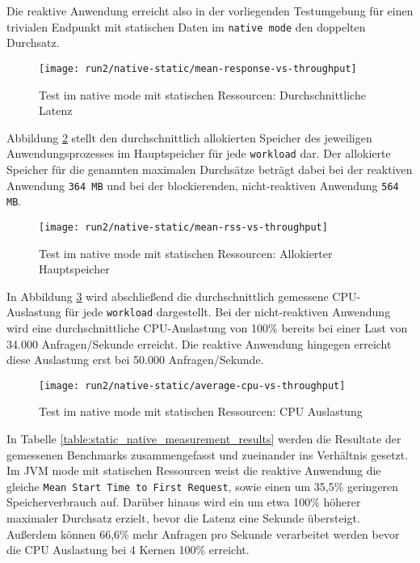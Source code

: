 Die reaktive Anwendung erreicht also in der vorliegenden Testumgebung für einen trivialen
Endpunkt mit statischen Daten im \verb|native mode| den doppelten Durchsatz.
\newpage
\begin{figure}[ht!]
  \centering
  \texttt{[image: run2/native-static/mean-response-vs-throughput]}
  \caption{Test im native mode mit statischen Ressourcen: Durchschnittliche Latenz}
  \label{fig:native_static_mean_response}
\end{figure}
Abbildung \ref{fig:native_static_mean_rss} stellt den durchschnittlich allokierten Speicher des jeweiligen Anwendungsprozesses
im Hauptspeicher für jede \verb|workload| dar. Der allokierte Speicher für die genannten maximalen Durchsätze beträgt dabei bei
der reaktiven Anwendung \verb|364 MB| und bei der blockierenden, nicht-reaktiven Anwendung \verb|564 MB|.
\newpage
\begin{figure}[ht!]
  \centering
  \texttt{[image: run2/native-static/mean-rss-vs-throughput]}
  \caption{Test im native mode mit statischen Ressourcen: Allokierter Hauptspeicher}
  \label{fig:native_static_mean_rss}
\end{figure}

In Abbildung \ref{fig:native_static_avg_cpu} wird abschließend die durchschnittlich gemessene CPU-Auslastung für jede \verb|workload|
dargestellt. Bei der nicht-reaktiven Anwendung wird eine durchschnittliche CPU-Auslastung von 100\% bereits bei einer Last von
34.000 Anfragen/Sekunde erreicht. Die reaktive Anwendung hingegen erreicht diese Auslastung erst bei 50.000 Anfragen/Sekunde.
\newpage
\begin{figure}[ht!]
  \centering
  \texttt{[image: run2/native-static/average-cpu-vs-throughput]}
  \caption{Test im native mode mit statischen Ressourcen: CPU Auslastung}
  \label{fig:native_static_avg_cpu}
\end{figure}

In Tabelle \ref{table:static_native_measurement_results} werden die Resultate der gemessenen Benchmarks zusammengefasst
und zueinander ins Verhältnis gesetzt. Im JVM mode mit statischen Ressourcen weist die reaktive Anwendung
die gleiche \verb|Mean Start Time to First Request|, sowie
einen um 35,5\% geringeren Speicherverbrauch auf.
Darüber hinaus wird ein um etwa 100\% höherer maximaler Durchsatz erzielt, bevor die Latenz eine Sekunde übersteigt.
Außerdem können 66,6\% mehr Anfragen pro Sekunde verarbeitet werden bevor die CPU Auslastung bei 4 Kernen 100\% erreicht.

